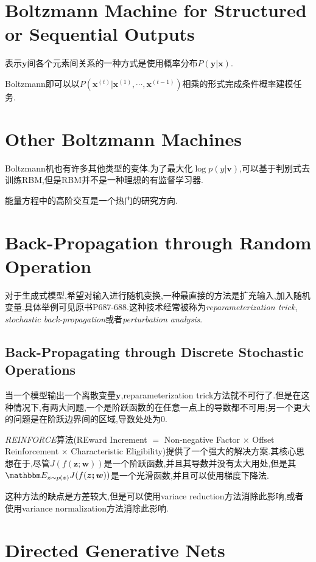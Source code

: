 \section{Boltzmann Machine for Structured or Sequential Outputs}

表示$\bm y$间各个元素间关系的一种方式是使用概率分布$P(\mathbf y|\bm x)$.

Boltzmann即可以以$P(\mathbf x^{(t)}|\mathbf x^{(1)},\cdots,\mathbf x^{(t-1)})$相乘的形式完成条件概率建模任务.

\section{Other Boltzmann Machines}

Boltzmann机也有许多其他类型的变体.为了最大化$\log p(y|\bm v)$,可以基于判别式去训练RBM,但是RBM并不是一种理想的有监督学习器.

能量方程中的高阶交互是一个热门的研究方向.

\section{Back-Propagation through Random Operation}

对于生成式模型,希望对输入进行随机变换,一种最直接的方法是扩充输入,加入随机变量.具体举例可见原书P$687$-$688$.这种技术经常被称为\textit{reparameterization trick}, \textit{stochastic back-propagation}或者\textit{perturbation analysis}.

\subsection{Back-Propagating through Discrete Stochastic Operations}

当一个模型输出一个离散变量$\bm y$,reparameterization trick方法就不可行了.但是在这种情况下,有两大问题,一个是阶跃函数的在任意一点上的导数都不可用;另一个更大的问题是在阶跃边界间的区域,导数处处为$0$.

\textit{REINFORCE}算法(REward Increment $=$ Non-negative Factor $\times$ Offset Reinforcement $\times$ Characteristic Eligibility)提供了一个强大的解决方案.其核心思想在于,尽管$J(f(\bm{z;w}))$是一个阶跃函数,并且其导数并没有太大用处,但是其$\mathbbm E_{\bm z\sim p(\bm z)}J(f(\bm{z;w}))$是一个光滑函数,并且可以使用梯度下降法.

这种方法的缺点是方差较大,但是可以使用variace reduction方法消除此影响,或者使用variance normalization方法消除此影响.

\section{Directed Generative Nets}

